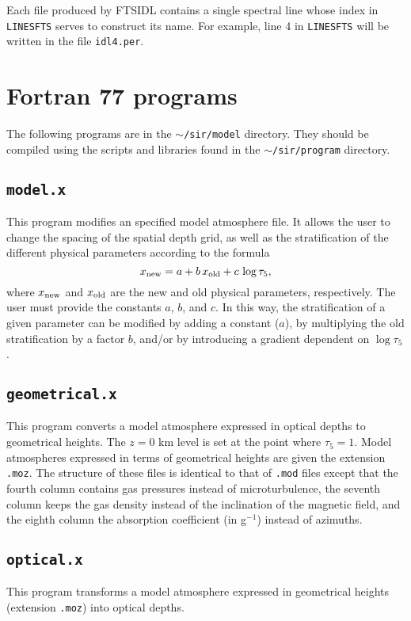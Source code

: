 Each file produced by FTSIDL contains a single spectral line whose index
in {\tt LINESFTS} serves to construct its name. For example,
line 4 in {\tt LINESFTS} will be written in the file {\tt idl4.per}.

\section{Fortran 77 programs} 
The following programs are in the {\tt $\sim$/sir/model} directory.
They should be compiled using the scripts and libraries found in 
the {\tt $\sim$/sir/program} directory.
 

\subsection{{\tt model.x}}
This program modifies an specified model atmosphere file. It allows
the user to change the spacing of the spatial depth grid, as well as 
the stratification of the different physical parameters according to
the formula
\begin{displaymath}
x_{\rm new} = a + b \, x_{\rm old} + c \, \log {\tau_5},
\end{displaymath}
where $x_{\rm new}$ and $x_{\rm old}$ are the new and old physical
parameters, respectively. The user must provide the constants $a$, $b$, and
$c$. In this way, the stratification of a given parameter can be modified
by adding a constant ($a$), by multiplying the old stratification by a
factor $b$, and/or by introducing a gradient dependent on $\log \tau_5$.

\subsection{{\tt geometrical.x}}
This program converts a model atmosphere expressed in optical depths
to geometrical heights. The $z=0$ km level is set at the point where
$\tau_5 =1$. Model atmospheres expressed in terms of geometrical heights
are given the extension {\tt .moz}. The structure of these files is
identical to that of {\tt .mod} files except that the fourth column
contains gas pressures instead of microturbulence, the seventh column
keeps the gas density instead of the inclination of the magnetic field, and
the eighth column the absorption coefficient (in g$^{-1}$) instead of
azimuths. 

\subsection{{\tt optical.x}}
This program transforms a model atmosphere expressed in geometrical
heights (extension {\tt .moz}) into optical depths.   

